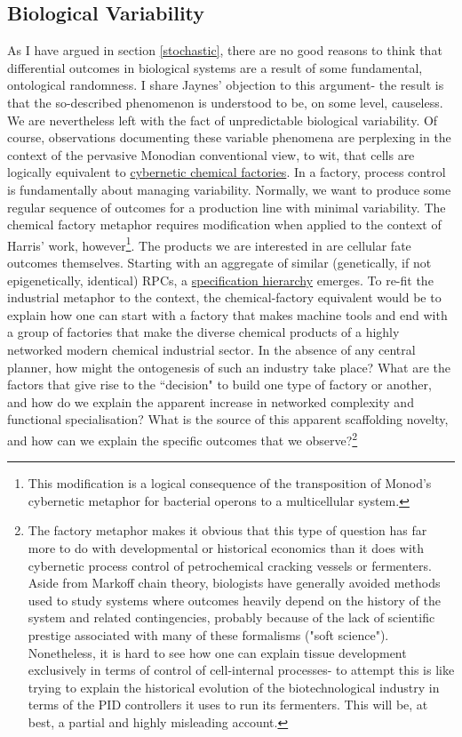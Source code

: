 \subsection{Biological Variability}
\label{variability}
As I have argued in section \ref{stochastic}, there are no good reasons to think that differential outcomes in biological systems are a result of some fundamental, ontological randomness. I share Jaynes' objection to this argument- the result is that the so-described phenomenon is understood to be, on some level, causeless. We are nevertheless left with the fact of unpredictable biological variability. Of course, observations documenting these variable phenomena are perplexing in the context of the pervasive Monodian conventional view, to wit, that cells are logically equivalent to \hyperref[cybernetics]{cybernetic chemical factories}. In a factory, process control is fundamentally about managing variability. Normally, we want to produce some regular sequence of outcomes for a production line with minimal variability. The chemical factory metaphor requires modification when applied to the context of Harris' work, however\footnote{This modification is a logical consequence of the transposition of Monod's cybernetic metaphor for bacterial operons to a multicellular system.}. The products we are interested in are cellular fate outcomes themselves. Starting with an aggregate of similar (genetically, if not epigenetically, identical) RPCs, a \hyperref[hierarchy]{specification hierarchy} emerges. To re-fit the industrial metaphor to the context, the chemical-factory equivalent would be to explain how one can start with a factory that makes machine tools and end with a group of factories that make the diverse chemical products of a highly networked modern chemical industrial sector. In the absence of any central planner, how might the ontogenesis of such an industry take place? What are the factors that give rise to the ``decision" to build one type of factory or another, and how do we explain the apparent increase in networked complexity and functional specialisation? What is the source of this apparent scaffolding novelty, and how can we explain the specific outcomes that we observe?\footnote{The factory metaphor makes it obvious that this type of question has far more to do with developmental or historical economics than it does with cybernetic process control of petrochemical cracking vessels or fermenters. Aside from Markoff chain theory, biologists have generally avoided methods used to study systems where outcomes heavily depend on the history of the system and related contingencies, probably because of the lack of scientific prestige associated with many of these formalisms ("soft science"). Nonetheless, it is hard to see how one can explain tissue development exclusively in terms of control of cell-internal processes- to attempt this is like trying to explain the historical evolution of the biotechnological industry in terms of the PID controllers it uses to run its fermenters. This will be, at best, a partial and highly misleading account.}

